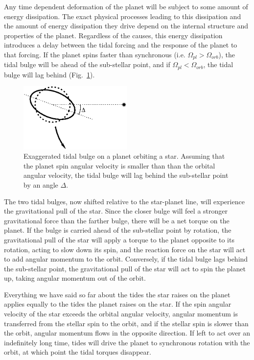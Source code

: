 Any time dependent deformation of the planet will be subject to some amount of
energy dissipation. The exact physical processes leading to this dissipation and
the amount of energy dissipation they drive depend on the internal structure and
properties of the planet. Regardless of the causes, this energy dissipation
introduces a delay between the tidal forcing and the response of the planet to
that forcing. If the planet spins faster than synchronous (i.e. $\Omega_{pl} >
\Omega_{orb}$), the tidal bulge will be ahead of the sub-stellar point, and if
$\Omega_{pl} < \Omega_{orb}$, the tidal bulge will lag behind
(Fig.~\ref{fig:tidal_bulge}).

\begin{figure}[t]
%
    \centering
%
    \includegraphics[width=0.5\textwidth]{tidal_bulge.eps}
%
    \caption{
%
        Exaggerated tidal bulge on a planet orbiting a star. Assuming that the
        planet spin angular velocity is smaller than than the orbital angular
        velocity, the tidal bulge will lag behind the sub-stellar point by an
        angle $\Delta$.
%
    }
%
    \label{fig:tidal_bulge}
%
\end{figure}

The two tidal bulges, now shifted relative to the star-planet line, will
experience the gravitational pull of the star. Since the closer bulge will feel
a stronger gravitational force than the farther bulge, there will be a net
torque on the planet. If the bulge is carried ahead of the sub-stellar point by
rotation, the gravitational pull of the star will apply a torque to the planet
opposite to its rotation, acting to slow down its spin, and the reaction force
on the star will act to add angular momentum to the orbit. Conversely, if the
tidal bulge lags behind the sub-stellar point, the gravitational pull of the
star will act to spin the planet up, taking angular momentum out of the orbit.

Everything we have said so far about the tides the star raises on the planet
applies equally to the tides the planet raises on the star. If the spin angular
velocity of the star exceeds the orbital angular velocity, angular momentum is
transferred from the stellar spin to the orbit, and if the stellar spin is
slower than the orbit, angular momentum flows in the opposite direction. If left
to act over an indefinitely long time, tides will drive the planet to
synchronous rotation with the orbit, at which point the tidal torques disappear.

